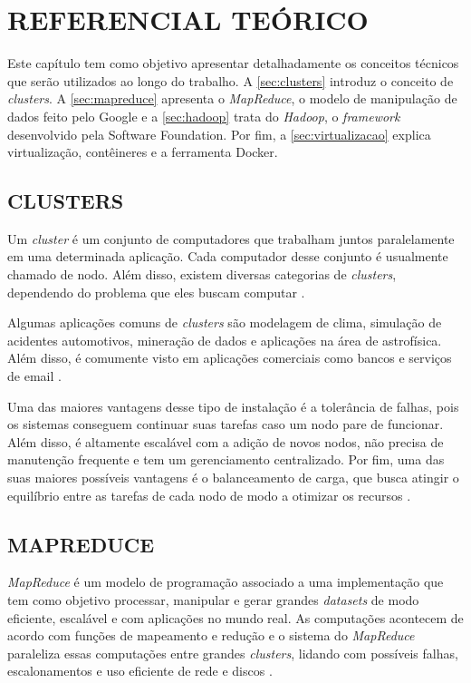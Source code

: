 \chapter{REFERENCIAL TEÓRICO} \label{cha:refteorico}

Este capítulo tem como objetivo apresentar detalhadamente os conceitos técnicos que serão utilizados ao longo do trabalho. A \autoref{sec:clusters} introduz o conceito de \textit{clusters}. A \autoref{sec:mapreduce} apresenta o \textit{MapReduce}, o modelo de manipulação de dados feito pelo Google e a \autoref{sec:hadoop} trata do \textit{Hadoop}, o \textit{\gls{framework}} desenvolvido pela  Software Foundation. Por fim, a \autoref{sec:virtualizacao} explica virtualização, contêineres e a ferramenta Docker.

\section{CLUSTERS} \label{sec:clusters}

Um \textit{cluster} é um conjunto de computadores que trabalham juntos paralelamente em uma determinada aplicação. Cada computador desse conjunto é usualmente chamado de nodo. Além disso, existem diversas categorias de \textit{clusters}, dependendo do problema que eles buscam computar \cite{GoldmanApache12}.

Algumas aplicações comuns de \textit{clusters} são modelagem de clima, simulação de acidentes automotivos, mineração de dados e aplicações na área de astrofísica. Além disso, é comumente visto em aplicações comerciais como bancos e serviços de email \cite{ClusterGridCloudComparison11}.

Uma das maiores vantagens desse tipo de instalação é a tolerância de falhas, pois os sistemas conseguem continuar suas tarefas caso um nodo pare de funcionar. Além disso, é altamente escalável com a adição de novos nodos, não precisa de manutenção frequente e tem um gerenciamento centralizado. Por fim, uma das suas maiores possíveis vantagens é o balanceamento de carga, que busca atingir o equilíbrio entre as tarefas de cada nodo de modo a otimizar os recursos \cite{ClusterGridCloudComparison11}.

\section{MAPREDUCE} \label{sec:mapreduce}

\textit{MapReduce} é um modelo de programação associado a uma implementação que tem como objetivo processar, manipular e gerar grandes \textit{datasets} de modo eficiente, escalável e com aplicações no mundo real. As computações acontecem de acordo com funções de mapeamento e redução e o sistema do \textit{MapReduce} paraleliza essas computações entre grandes \textit{clusters}, lidando com possíveis falhas, escalonamentos e uso eficiente de rede e discos \cite{MapReduce08}.

